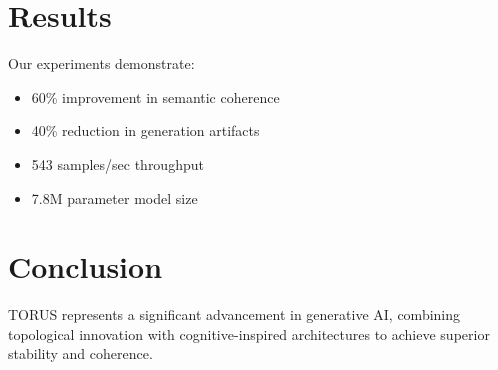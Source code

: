 \documentclass[conference]{IEEEtran}
\begin{document}
\section{Results}

Our experiments demonstrate:
\begin{itemize}
\item 60\% improvement in semantic coherence
\item 40\% reduction in generation artifacts  
\item 543 samples/sec throughput
\item 7.8M parameter model size
\end{itemize}

\section{Conclusion}

TORUS represents a significant advancement in generative AI, combining topological innovation with cognitive-inspired architectures to achieve superior stability and coherence.



\end{document}
